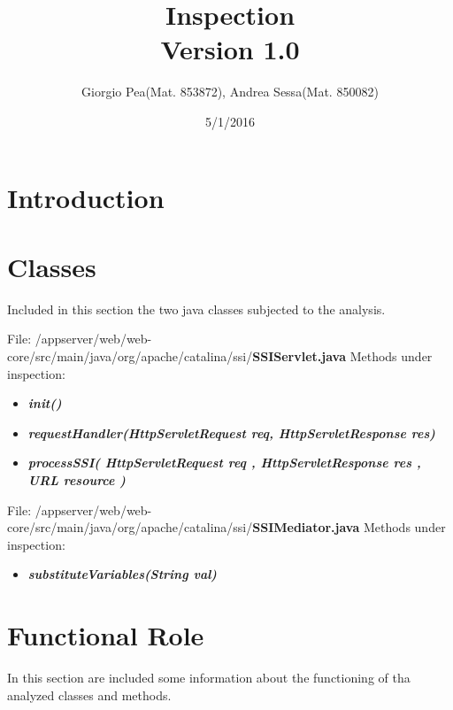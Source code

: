 \documentclass[11pt,titlepage]{article} %
\title{Inspection \\ \vspace{1cm} \large{Version 1.0}}
\author{Giorgio Pea(Mat. 853872), Andrea Sessa(Mat. 850082)}
\date{5/1/2016}
\begin{document}
\maketitle

\newpage

\tableofcontents

\newpage

\section{Introduction}

\section{Classes}

Included in this section the two java classes subjected to the analysis.\newline

\noindent File: /appserver/web/web-core/src/main/java/org/apache/catalina/ssi/\textbf{SSIServlet.java}\newline\newline
Methods under inspection:
  \begin{itemize}
    \item \textbf{\textit{init()}}
    \item \textbf{\textit{requestHandler(HttpServletRequest req, HttpServletResponse res)}}
    \item \textbf{\textit{processSSI( HttpServletRequest req , HttpServletResponse res , URL resource )}}
  \end{itemize}

\noindent File: /appserver/web/web-core/src/main/java/org/apache/catalina/ssi/\textbf{SSIMediator.java}\newline\newline
Methods under inspection:
  \begin{itemize}
    \item \textbf{\textit{substituteVariables(String val)}}
  \end{itemize}
  
\newpage


\section{Functional Role}
  In this section are included some information about the functioning of tha analyzed classes and methods.\newline
\end{document}
